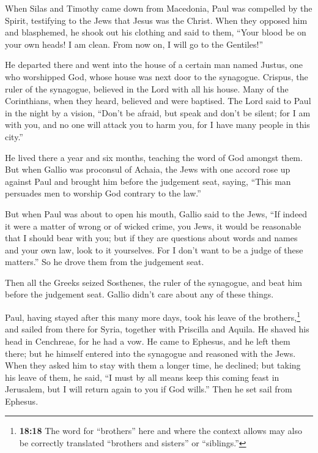  When Silas and Timothy came down from Macedonia, Paul was
compelled by the Spirit, testifying to the Jews that Jesus was the
Christ.  When they opposed him and blasphemed, he shook
out his clothing and said to them, ``Your blood be on your own heads! I
am clean. From now on, I will go to the Gentiles!''

 He departed there and went into the house of a certain
man named Justus, one who worshipped God, whose house was next door to
the synagogue.  Crispus, the ruler of the synagogue,
believed in the Lord with all his house. Many of the Corinthians, when
they heard, believed and were baptised.  The Lord said to
Paul in the night by a vision, ``Don't be afraid, but speak and don't be
silent;  for I am with you, and no one will attack you to
harm you, for I have many people in this city.''

 He lived there a year and six months, teaching the word
of God amongst them.  But when Gallio was proconsul of
Achaia, the Jews with one accord rose up against Paul and brought him
before the judgement seat,  saying, ``This man persuades
men to worship God contrary to the law.''

 But when Paul was about to open his mouth, Gallio said
to the Jews, ``If indeed it were a matter of wrong or of wicked crime,
you Jews, it would be reasonable that I should bear with you;
 but if they are questions about words and names and your
own law, look to it yourselves. For I don't want to be a judge of these
matters.''  So he drove them from the judgement seat.

 Then all the Greeks seized Sosthenes, the ruler of the
synagogue, and beat him before the judgement seat. Gallio didn't care
about any of these things.

 Paul, having stayed after this many more days, took his
leave of the brothers,\footnote{\textbf{18:18} The word for ``brothers''
  here and where the context allows may also be correctly translated
  ``brothers and sisters'' or ``siblings.''} and sailed from there for
Syria, together with Priscilla and Aquila. He shaved his head in
Cenchreae, for he had a vow.  He came to Ephesus, and he
left them there; but he himself entered into the synagogue and reasoned
with the Jews.  When they asked him to stay with them a
longer time, he declined;  but taking his leave of them,
he said, ``I must by all means keep this coming feast in Jerusalem, but
I will return again to you if God wills.'' Then he set sail from
Ephesus.


